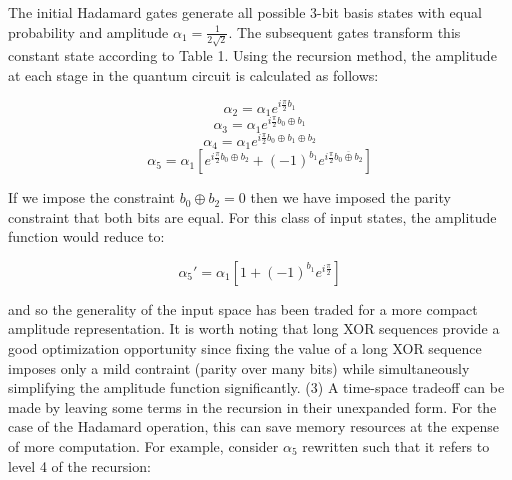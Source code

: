 \documentclass[reqno]{amsart}
\theoremstyle{definition}
\theoremstyle{remark}
\begin{document}
\noindent
The initial Hadamard gates generate all possible 3-bit basis states with equal probability and amplitude $\alpha_1= \frac{1}{2 \sqrt{2}}$. The subsequent gates transform this constant state according to Table 1. Using the recursion method, the amplitude at each stage in the quantum circuit is calculated as follows:

\begin{equation}
\alpha_2  = \alpha_1 e^{i \frac{\pi}{2} b_1}
\end{equation}
\begin{equation}
\alpha_3  = \alpha_1 e^{i \frac{\pi}{2} b_0\oplus b_1}
\end{equation}
\begin{equation}
\alpha_4  = \alpha_1 e^{i \frac{\pi}{2} b_0\oplus b_1\oplus b_2}
\end{equation}
\begin{equation}
\alpha_5  = \alpha_1 [ e^{i \frac{\pi}{2} b_0\oplus b_2} + (-1)^{b_1} e^{i \frac{\pi}{2} \overline{b_0\oplus b_2}}   ]
\end{equation}
\newline

\noindent
If we impose the constraint $b_0\oplus b_2=0$ then we have imposed the parity constraint that both bits are equal. For this class of input states, the amplitude function would reduce to:

\begin{equation}
\alpha_5'  = \alpha_1 [ 1+(-1)^{b_1} e^{i \frac{\pi}{2} } ]
\end{equation}
\newline

\noindent
and so the generality of the input space has been traded for a more compact amplitude representation. It is worth noting that long XOR sequences provide a good optimization opportunity since fixing the value of a long XOR sequence imposes only a mild contraint (parity over many bits) while simultaneously simplifying the amplitude function significantly.\newline
\newline
\noindent
(3) A time-space tradeoff can be made by leaving some terms in the recursion in their unexpanded form. For the case of the Hadamard operation, this can save memory resources at the expense of more computation. For example, consider $\alpha_5$ rewritten such that it refers to level 4 of the recursion:
\end{document}
